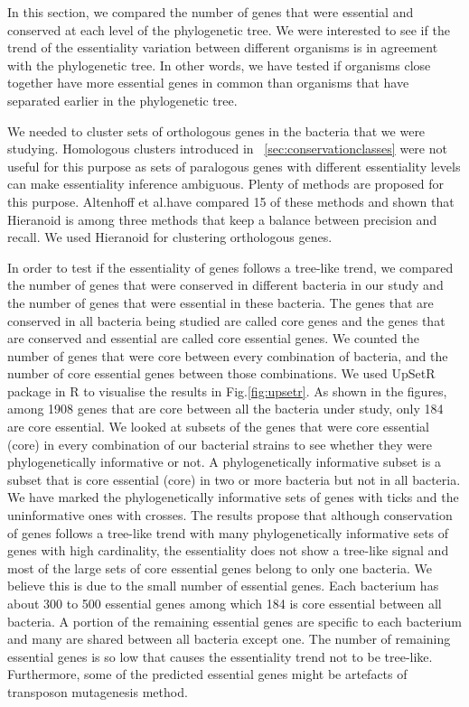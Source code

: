 \documentclass[12pt,letterpaper]{article}
\begin{document}
In this section, we compared the number of genes that were essential and conserved at each level of the phylogenetic tree. We were interested to see if the trend of the essentiality variation between different organisms is in agreement with the phylogenetic tree. In other words, we have tested if organisms close together have more essential genes in common than organisms that have separated earlier in the phylogenetic tree.

We needed to cluster sets of orthologous genes in the bacteria that we were studying. Homologous clusters introduced in ~\ref{sec:conservationclasses} were not useful for this purpose as sets of paralogous genes with different essentiality levels can make essentiality inference ambiguous. Plenty of methods are proposed for this purpose. Altenhoff et al.\@ have compared 15 of these methods \cite{altenhoff_standardized_2016} and shown that Hieranoid \cite{schreiber_hieranoid:_2013} is among three methods that keep a balance between precision and recall. We used Hieranoid for clustering orthologous genes.

In order to test if the essentiality of genes follows a tree-like trend, we compared the number of genes that were conserved in different bacteria in our study and the number of genes that were essential in these bacteria. The genes that are conserved in all bacteria being studied are called core genes and the genes that are conserved and essential are called core essential genes. We counted the number of genes that were core between every combination of bacteria, and the number of core essential genes between those combinations. We used UpSetR package \cite{conway_upsetr:_2016} in R to visualise the results in Fig.\@ \ref{fig:upsetr}. As shown in the figures, among 1908 genes that are core between all the bacteria under study, only 184 are core essential. We looked at subsets of the genes that were core essential (core) in every combination of our bacterial strains to see whether they were phylogenetically informative or not. A phylogenetically informative subset is a subset that is core essential (core) in two or more bacteria but not in all bacteria. We have marked the phylogenetically informative sets of genes with ticks and the uninformative ones with crosses. The results propose that although conservation of genes follows a tree-like trend with many phylogenetically informative sets of genes with high cardinality, the essentiality does not show a tree-like signal and most of the large sets of core essential genes belong to only one bacteria. We believe this is due to the small number of essential genes. Each bacterium has about 300 to 500 essential genes among which 184 is core essential between all bacteria. A portion of the remaining essential genes are specific to each bacterium and many are shared between all bacteria except one. The number of remaining essential genes is so low that causes the essentiality trend not to be tree-like. Furthermore, some of the predicted essential genes might be artefacts of transposon mutagenesis method.
\end{document}
